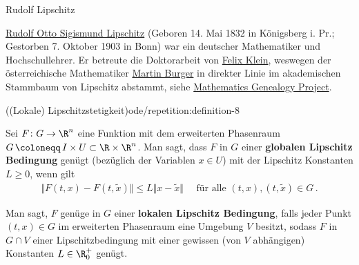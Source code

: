 \documentclass[letterpaper,10pt,german]{jupyterBook}
\begin{document}
\begin{emphBox}{Rudolf Lipschitz}{}

\par
\href{https://de.wikipedia.org/wiki/Rudolf\_Lipschitz}{Rudolf Otto Sigismund Lipschitz} (Geboren 14. Mai 1832 in Königsberg i. Pr.; Gestorben 7. Oktober 1903 in Bonn) war ein deutscher Mathematiker und Hochschullehrer. Er betreute die Doktorarbeit von \href{https://en.wikipedia.org/wiki/Felix\_Klein}{Felix Klein}, weswegen der österreichische Mathematiker \href{https://www.math.fau.de/angewandte-mathematik-1/mitarbeiter/prof-dr-martin-burger/}{Martin Burger} in direkter Linie im akademischen Stammbaum von Lipschitz abstammt, siehe \href{https://genealogy.math.ndsu.nodak.edu/index.php}{Mathematics Genealogy Project}.
\end{emphBox}
\begin{definition}{((Lokale) Lipschitzstetigkeit)}{ode/repetition:definition-8}



\par
Sei \(F \colon G \to \R^n\) eine Funktion mit dem erweiterten Phasenraum \(G \, \coloneqq \, I \times U \subset \R\times\R^n\).
Man sagt, dass \(F\) in \(G\) einer \textbf{globalen Lipschitz Bedingung} genügt (bezüglich der Variablen \(x \in U\)) mit der Lipschitz Konstanten \(L\geq0\), wenn gilt
\begin{align*}
\Vert F(t,x) - F(t,\widetilde{x}) \Vert \leq L \Vert x-\widetilde{x}\Vert\quad\text{ für alle }(t,x), (t,\widetilde{x})\in G\,.
\end{align*}
\par
Man sagt, \(F\) genüge in \(G\) einer \textbf{lokalen Lipschitz Bedingung}, falls jeder Punkt \((t,x)\in G\) im erweiterten Phasenraum eine Umgebung \(V\) besitzt, sodass \(F\) in \(G\cap V\) einer Lipschitzbedingung mit einer gewissen (von \(V\) abhängigen) Konstanten \(L\in\R_0^+\) genügt.
\end{definition}
\end{document}
